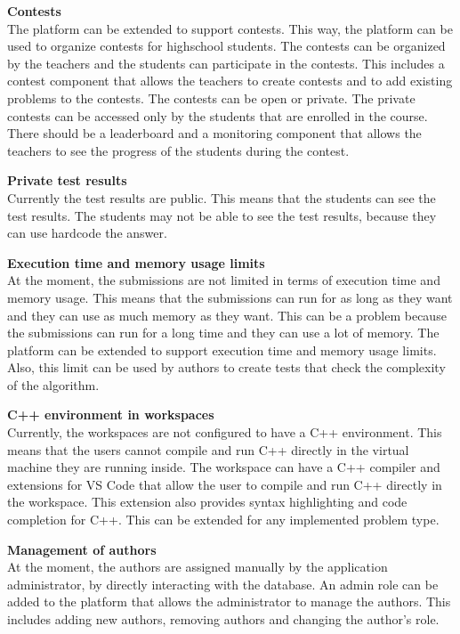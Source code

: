 \documentclass[12pt,a4paper]{report}
\begin{document}
\textbf{Contests}
\\
The platform can be extended to support contests. This way, the platform can be used to organize contests for highschool students. The contests can be organized by the teachers and the students can participate in the contests. This includes a contest component that allows the teachers to create contests and to add existing problems to the contests. The contests can be open or private. The private contests can be accessed only by the students that are enrolled in the course. There should be a leaderboard and a monitoring component that allows the teachers to see the progress of the students during the contest.

\textbf{Private test results}
\\
Currently the test results are public. This means that the students can see the test results. The students may not be able to see the test results, because they can use hardcode the answer.

\textbf{Execution time and memory usage limits}
\\
At the moment, the submissions are not limited in terms of execution time and memory usage. This means that the submissions can run for as long as they want and they can use as much memory as they want. This can be a problem because the submissions can run for a long time and they can use a lot of memory. The platform can be extended to support execution time and memory usage limits. Also, this limit can be used by authors to create tests that check the complexity of the algorithm.

\textbf{C++ environment in workspaces}
\\
Currently, the workspaces are not configured to have a C++ environment. This means that the users cannot compile and run C++ directly in the virtual machine they are running inside. The workspace can have a C++ compiler and extensions for VS Code that allow the user to compile and run C++ directly in the workspace. This extension also provides syntax highlighting and code completion for C++. This can be extended for any implemented problem type.

\textbf{Management of authors}
\\
At the moment, the authors are assigned manually by the application administrator, by directly interacting with the database. An admin role can be added to the platform that allows the administrator to manage the authors. This includes adding new authors, removing authors and changing the author's role.
\end{document}
